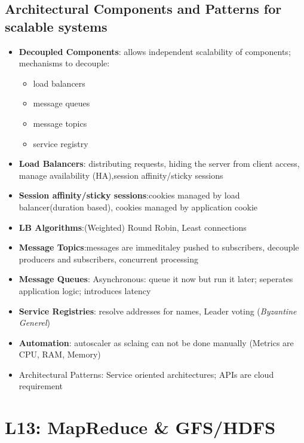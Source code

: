 \documentclass[a4paper]{article}
\begin{document}
\begin{multicols}{3}
\subsection{Architectural Components and Patterns for scalable systems}
\begin{itemize}
    \item \textbf{Decoupled Components}: allows independent scalability of components; mechanisms to decouple:
    \begin{itemize}
        \item load balancers
        \item message queues
        \item message topics
        \item service registry
    \end{itemize}
    \item \textbf{Load Balancers}: distributing requests, hiding the server from client access, manage availability (HA),session affinity/sticky sessions
    \item \textbf{Session affinity/sticky sessions}:cookies managed by load balancer(duration based), cookies managed by application cookie
    \item \textbf{LB Algorithms}:(Weighted) Round Robin, Least connections
    \item \textbf{Message Topics}:messages are immeditaley pushed to subscribers, decouple producers and subscribers, concurrent processing
    \item \textbf{Message Queues}: Asynchronous: queue it now but run it later; seperates application logic; introduces latency
    \item \textbf{Service Registries}: resolve addresses for names, Leader voting (\textit{Byzantine Generel})
    \item \textbf{Automation}: autoscaler as sclaing can not be done manually (Metrics are CPU, RAM, Memory)
    \item Architectural Patterns: Service oriented architectures;  APIs are cloud requirement
\end{itemize}

\section{L13: MapReduce \& GFS/HDFS}


\end{multicols}
\end{document}
